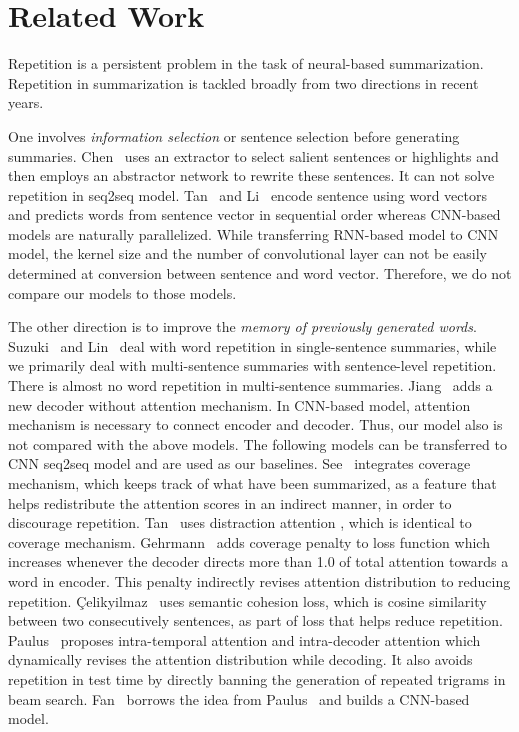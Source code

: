 \section{Related Work}
\label{sec:related}

Repetition is a persistent problem in the task of 
neural-based summarization. 
Repetition in summarization is tackled broadly from two directions in recent years. 

One involves {\em information selection} or sentence
selection before generating summaries.
Chen~ uses an extractor  
to select salient sentences or highlights and then employs 
an abstractor network to rewrite these sentences.
It can not solve repetition in seq2seq model.
Tan~ and Li~ encode
sentence using word vectors
and predicts words from sentence vector in sequential order 
whereas CNN-based models are naturally parallelized. 
While transferring RNN-based model to CNN model, the kernel size and the number of 
convolutional layer can not be easily determined at conversion between sentence and word vector. 
Therefore, we do not compare our models to those models. 

The other direction is to improve the 
{\em memory of previously generated words}.
Suzuki~ and Lin~ 
deal with word repetition in single-sentence summaries, 
while we primarily deal with multi-sentence summaries with 
sentence-level repetition. 
There is almost no word repetition in multi-sentence summaries.
Jiang~ adds a new decoder without attention mechanism.
In CNN-based model, attention mechanism is necessary to connect encoder 
and decoder.
Thus, our model also is not compared with the above models. 
The following models can be transferred to CNN seq2seq model and
are used as our baselines.
See~ integrates coverage mechanism, 
which keeps track of what have been summarized, as a feature that helps 
redistribute the attention scores in an indirect manner,
in order to discourage repetition. 
Tan~ uses distraction attention
\cite{ChenZLWJ16}, which is identical to coverage mechanism. 
Gehrmann~ adds coverage penalty to loss function
which increases whenever the decoder directs more than 1.0 of total attention
towards a word in encoder.
This penalty indirectly revises attention distribution to reducing repetition.
{\c{C}}elikyilmaz~ uses semantic cohesion loss,
which is cosine similarity between two consecutively sentences, as part of
loss that helps reduce repetition.
Paulus~ proposes intra-temporal attention \cite{NallapatiZSGX16} and 
intra-decoder attention which dynamically revises the attention distribution while decoding. 
It also avoids repetition in test time by directly banning the generation of 
repeated trigrams in beam search. 
Fan~ borrows the idea from Paulus~ and 
builds a CNN-based model. 


